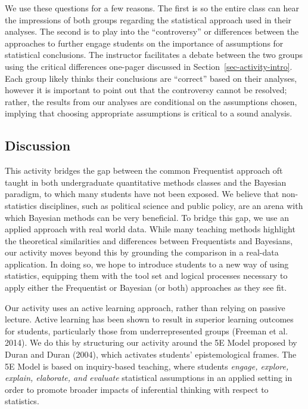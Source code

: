 \documentclass[
  12pt,
  letterpaper,
  DIV=11,
  numbers=noendperiod]{scrartcl}
\begin{document}
We use these questions for a few reasons. The first is so the entire
class can hear the impressions of both groups regarding the statistical
approach used in their analyses. The second is to play into the
``controversy'' or differences between the approaches to further engage
students on the importance of assumptions for statistical conclusions.
The instructor facilitates a debate between the two groups using the
critical differences one-pager discussed in
Section~\ref{sec-activity-intro}. Each group likely thinks their
conclusions are ``correct'' based on their analyses, however it is
important to point out that the controversy cannot be resolved; rather,
the results from our analyses are conditional on the assumptions chosen,
implying that choosing appropriate assumptions is critical to a sound
analysis.

\hypertarget{sec-discussion}{%
\subsection{Discussion}\label{sec-discussion}}

This activity bridges the gap between the common Frequentist approach
oft taught in both undergraduate quantitative methods classes and the
Bayesian paradigm, to which many students have not been exposed. We
believe that non-statistics disciplines, such as political science and
public policy, are an arena with which Bayesian methods can be very
beneficial. To bridge this gap, we use an applied approach with real
world data. While many teaching methods highlight the theoretical
similarities and differences between Frequentists and Bayesians, our
activity moves beyond this by grounding the comparison in a real-data
application. In doing so, we hope to introduce students to a new way of
using statistics, equipping them with the tool set and logical processes
necessary to apply either the Frequentist or Bayesian (or both)
approaches as they see fit.

Our activity uses an active learning approach, rather than relying on
passive lecture. Active learning has been shown to result in superior
learning outcomes for students, particularly those from underrepresented
groups (Freeman et al. 2014). We do this by structuring our activity
around the 5E Model proposed by Duran and Duran (2004), which activates
students' epistemological frames. The 5E Model is based on inquiry-based
teaching, where students \emph{engage, explore, explain, elaborate, and
evaluate} statistical assumptions in an applied setting in order to
promote broader impacts of inferential thinking with respect to
statistics.
\end{document}

